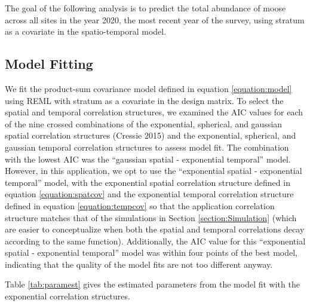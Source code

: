 \documentclass[]{article}    %
\begin{document}
The goal of the following analysis is to predict the total abundance of
moose across all sites in the year 2020, the most recent year of the
survey, using stratum as a covariate in the spatio-temporal model.

\hypertarget{subsection:modelfit}{%
\subsection{Model Fitting}\label{subsection:modelfit}}

We fit the product-sum covariance model defined in equation
\ref{equation:model} using REML with stratum as a covariate in the
design matrix. To select the spatial and temporal correlation
structures, we examined the AIC values for each of the nine crossed
combinations of the exponential, spherical, and gaussian spatial
correlation structures (Cressie 2015) and the exponential, spherical,
and gaussian temporal correlation structures to assess model fit. The
combination with the lowest AIC was the ``gaussian spatial - exponential
temporal'' model. However, in this application, we opt to use the
``exponential spatial - exponential temporal'' model, with the
exponential spatial correlation structure defined in equation
\ref{equation:spatcov} and the exponential temporal correlation
structure defined in equation \ref{equation:tempcov} so that the
application correlation structure matches that of the simulations in
Section \ref{section:Simulation} (which are easier to conceptualize when
both the spatial and temporal correlations decay according to the same
function). Additionally, the AIC value for this ``exponential spatial -
exponential temporal'' model was within four points of the best model,
indicating that the quality of the model fits are not too different
anyway.

Table \ref{tab:paramest} gives the estimated parameters from the model
fit with the exponential correlation structures.
\end{document}
